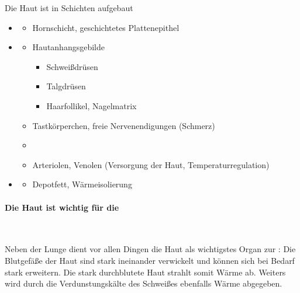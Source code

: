 Die Haut ist in Schichten aufgebaut%

 
 



\begin{itemize}
    \item {} 
    \begin{itemize}
        \item Hornschicht, geschichtetes Plattenepithel
    \end{itemize}
    \item {} 
    \begin{itemize}
        \item Hautanhangsgebilde
        \begin{itemize}
            \item Schwei{\ss}dr\"usen
            \item Talgdr\"usen
            \item Haarfollikel, Nagelmatrix
        \end{itemize}
        \item Tastk\"orperchen, freie Nervenendigungen (Schmerz)
        \item {}
        \item Arteriolen, Venolen (Versorgung der Haut, Temperaturregulation)
    \end{itemize}
    \item {} 
    \begin{itemize}
        \item Depotfett, W\"armeisolierung
    \end{itemize}
\end{itemize}

\paragraph{Die Haut ist wichtig f\"ur die
}~

Neben der Lunge dient vor allen Dingen  die Haut als wichtigstes Organ
zur : Die Blutgef\"a{\ss}e  der  Haut
sind stark ineinander verwickelt und k\"onnen sich bei Bedarf stark erweitern. Die
stark durchblutete  Haut strahlt somit W\"arme ab. Weiters wird durch
die Verdunstungsk\"alte  des Schwei{\ss}es  ebenfalls W\"arme
abgegeben. 

